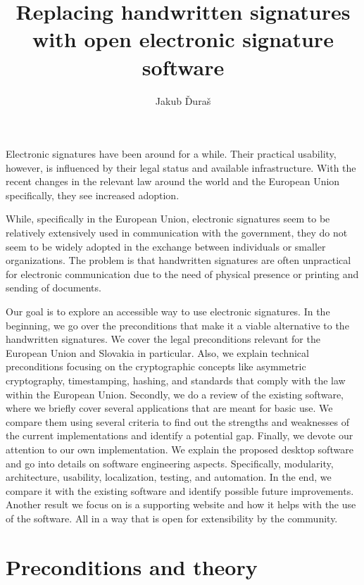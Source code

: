 \documentclass[thesismargins, english, thesislinespacing, onelinechapterstyle, upjsfrontpage]{rnthesis}
\title{Replacing handwritten signatures with open electronic signature software}
\author{Jakub Ďuraš}
\begin{document}
\maketitle

\newpage

\tableofcontents
\iffalse %
\listoffigures
\listoftables
\fi

\uvod

Electronic signatures have been around for a while.
Their practical usability, however, is influenced by their legal status and available infrastructure.
With the recent changes in the relevant law around the world and the European Union specifically, they see increased adoption.

While, specifically in the European Union, electronic signatures seem to be relatively extensively used in communication with the government, they do not seem to be widely adopted in the exchange between individuals or smaller organizations.
The problem is that handwritten signatures are often unpractical for electronic communication due to the need of physical presence or printing and sending of documents.

Our goal is to explore an accessible way to use electronic signatures.
In the beginning, we go over the preconditions that make it a viable alternative to the handwritten signatures.
We cover the legal preconditions relevant for the European Union and Slovakia in particular.
Also, we explain technical preconditions focusing on the cryptographic concepts like asymmetric cryptography, timestamping, hashing, and standards that comply with the law within the European Union.
Secondly, we do a review of the existing software, where we briefly cover several applications that are meant for basic use.
We compare them using several criteria to find out the strengths and weaknesses of the current implementations and identify a potential gap.
Finally, we devote our attention to our own implementation.
We explain the proposed desktop software and go into details on software engineering aspects.
Specifically, modularity, architecture, usability, localization, testing, and automation.
In the end, we compare it with the existing software and identify possible future improvements.
Another result we focus on is a supporting website and how it helps with the use of the software.
All in a way that is open for extensibility by the community.

\chapter{Preconditions and theory}
\end{document}
